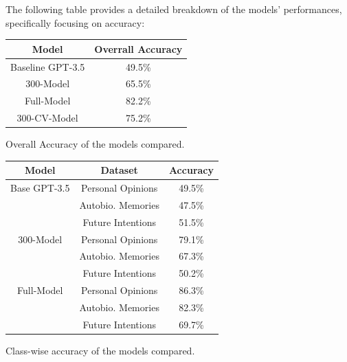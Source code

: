 \documentclass[10pt,twocolumn,letterpaper]{article}
\begin{document}
The following table provides a detailed breakdown of the models' performances,
specifically focusing on accuracy:

\begin{center}

    \begin{tabular}{cc}
        \toprule
        Model & Overrall Accuracy \\
        \midrule
        Baseline GPT-3.5  & 49.5\% \\
        \midrule
        300-Model & 65.5\% \\
        \midrule
        Full-Model & 82.2\% \\
         \midrule
        300-CV-Model & 75.2\% \\
        \bottomrule
    \end{tabular}
    
\end{center}

\begin{center}
\small {Overall Accuracy of the models compared.}
\end{center}

\begin{center}

    \begin{tabular}{ccc}
        \toprule
        Model & Dataset & Accuracy \\
        \midrule
        Base GPT-3.5 & Personal Opinions & 49.5\% \\
                        & Autobio. Memories & 47.5\% \\
                        & Future Intentions & 51.5\% \\
        \midrule
        300-Model & Personal Opinions & 79.1\% \\
                    & Autobio. Memories & 67.3\% \\
                    & Future Intentions & 50.2\% \\
        \midrule
        Full-Model & Personal Opinions & 86.3\% \\
                    & Autobio. Memories & 82.3\% \\
                    & Future Intentions & 69.7\% \\
        \bottomrule
    \end{tabular} 
\end{center}


\begin{center}
    \small {Class-wise accuracy of the models compared.}
\end{center}
\end{document}
